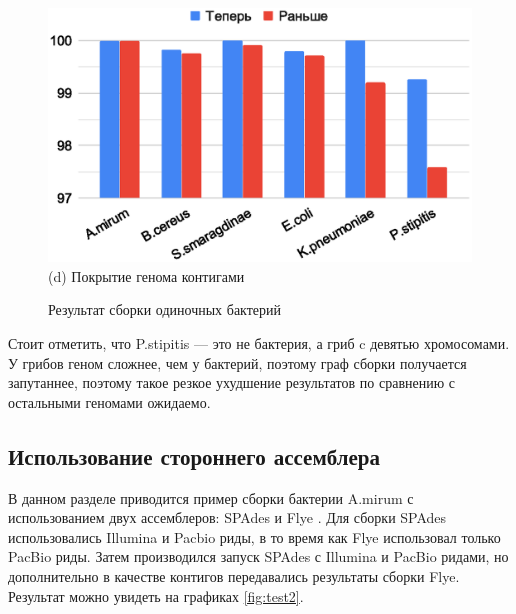 \documentclass[14pt]{matmex-diploma-custom}
\begin{document}
\begin{figure}[h]
\begin{minipage}{0.5\textwidth}
\end{minipage}
\begin{minipage}{0.5\textwidth}
	\centering
	\includegraphics[scale=0.55]{cov1.eps} \small{(d) Покрытие генома контигами}
\end{minipage}
\caption{Результат сборки одиночных бактерий}
\label{fig:test1}
\end{figure}

Стоит отметить, что P.stipitis --- это не бактерия, а гриб c девятью хромосомами. У грибов геном сложнее, чем у бактерий, поэтому граф сборки получается запутаннее, поэтому такое резкое ухудшение результатов по сравнению с остальными геномами ожидаемо.

\subsection{Использование стороннего ассемблера}
В данном разделе приводится пример сборки бактерии A.mirum с использованием двух ассемблеров: SPAdes и Flye \cite{art:flye}. Для сборки SPAdes использовались Illumina и Pacbio \cite{art:reads} риды, в то время как Flye использовал только PacBio риды. Затем производился запуск SPAdes с Illumina и PacBio ридами, но дополнительно в качестве контигов передавались результаты сборки Flye. Результат можно увидеть на графиках \ref{fig:test2}.
\end{document}
